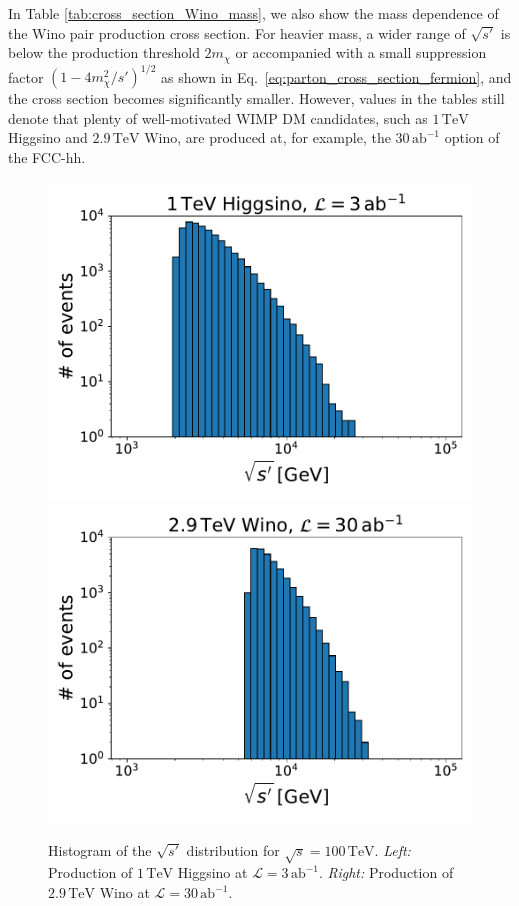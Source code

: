 \documentclass[12pt,twoside,book]{article}
\begin{document}
In Table \ref{tab:cross_section_Wino_mass}, we also show the mass dependence of the Wino pair production cross section.
For heavier mass, a wider range of $\sqrt{s'}$ is below the production threshold $2 m_{\chi}$ or accompanied with a small suppression factor $\left( 1-4 m_\chi^2 / s' \right)^{1/2}$ as shown in Eq.~\eqref{eq:parton_cross_section_fermion}, and the cross section becomes significantly smaller.
However, values in the tables still denote that plenty of well-motivated WIMP DM candidates, such as $1\,\mathrm{TeV}$ Higgsino and $2.9\,\mathrm{TeV}$ Wino, are produced at, for example, the $30\,\mathrm{ab}^{-1}$ option of the FCC-hh.

\begin{figure}[t]
  \centering
  \includegraphics[width=0.48\hsize]{invariant_mass_Higgsino.pdf}
  \includegraphics[width=0.48\hsize]{invariant_mass_Wino.pdf}
  \caption{
    Histogram of the $\sqrt{s'}$ distribution for $\sqrt{s} = 100\,\mathrm{TeV}$.
    \textit{Left:} Production of $1\,\mathrm{TeV}$ Higgsino at $\mathcal{L} = 3\,\mathrm{ab}^{-1}$.
    \textit{Right:} Production of $2.9\,\mathrm{TeV}$ Wino at $\mathcal{L} = 30\,\mathrm{ab}^{-1}$.}
  \label{fig:invariant_mass}
\end{figure}
\end{document}
